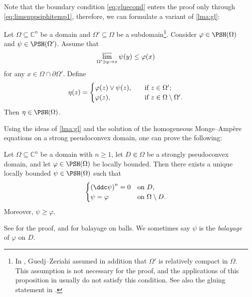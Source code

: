 Note that the boundary condition \eqref{eq:gluecond} enters the proof only through \eqref{eq:limsuppsiphitemp1}, therefore, we can formulate a variant of \cref{lma:gl}:
\begin{corollary}\label{cor:glbdry}
    Let $\Omega\subseteq \mathbb{C}^n$ be a domain and $\Omega'\subseteq \Omega$ be a subdomain\footnote{In \cite[Proposition~1.30]{GZ17}, Guedj--Zeriahi assumed in addition that $\Omega'$ is relatively compact in $\Omega$. This assumption is not necessary for the proof, and the applications of this proposition in \cite{GZ17} usually do not satisfy this condition. See also the gluing statement in \cite[Proposition~8.2.5]{FPT}.}. Consider $\varphi\in \PSH(\Omega)$ and $\psi\in \PSH(\Omega')$. Assume that
    \[
        \varlimsup_{\Omega'\ni y\to x}\psi(y)\leq \varphi(x)
    \]
    for any $x\in \Omega\cap\partial\Omega'$. Define
    \[
    \eta(z)=\begin{cases}
        \varphi(z)\lor \psi(z),&\quad \textup{if }z\in \Omega';\\
        \varphi(z),&\quad \textup{if }z\in \Omega\setminus\Omega'.
    \end{cases}
    \]
    Then $\eta\in \PSH(\Omega)$.
\end{corollary}


Using the ideas of \cref{lma:gl} and the solution of the homogeneous Monge--Ampère equations on a strong pseudoconvex domain, one can prove the following:
\begin{proposition}\label{prop:BT_balayage}
Let $\Omega \subseteq \mathbb{C}^n$ be a domain with $n\geq 1$, let $D \Subset \Omega$ be a strongly pseudoconvex domain, and let $\varphi \in \PSH(\Omega)$ be locally bounded.
Then there exists a unique locally bounded $\psi\in \PSH(\Omega)$
such that
\[
\begin{cases}
\left(\ddc\psi\right)^n = 0& \textup{on } D,\\
\psi = \varphi & \textup{on } \Omega\setminus D.
\end{cases}
\]
Moreover, $\psi\geq \varphi$.
\end{proposition}
See \cite[Proposition~9.1]{BT82} for the proof, and \cite[Corollary~9.6.4]{FPT} for balayage on balls. We sometimes say $\psi$ is the \emph{balayage} of $\varphi$ on $D$.

